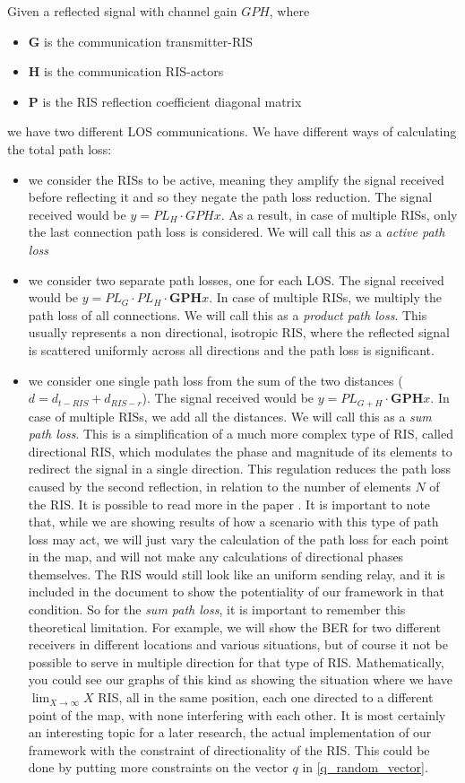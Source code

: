 Given a reflected signal with channel gain $GPH$, where
\begin{itemize}
  \item $\bm{G}$ is the communication transmitter-RIS
  \item $\bm{H}$ is the communication RIS-actors
  \item $\bm{P}$ is the RIS reflection coefficient diagonal matrix
\end{itemize}
we have two different LOS communications. We have different ways of calculating the total path loss:
\begin{itemize}
  \item we consider the RISs to be active, meaning they amplify the signal received before reflecting it and so they negate the path loss reduction. The signal received would be $y = PL_H \cdot GPHx$. As a result, in case of multiple RISs, only the last connection path loss is considered. We will call this as a \textit{active path loss}
  \item we consider two separate path losses, one for each LOS. The signal received would be $y = PL_G \cdot PL_H \cdot \bm{GPH}x$. In case of multiple RISs, we multiply the path loss of all connections. We will call this as a \textit{product path loss}. This usually represents a non directional, isotropic RIS, where the reflected signal is scattered uniformly across all directions and the path loss is significant.
  \item we consider one single path loss from the sum of the two distances ($d = d_{t-RIS} + d_{RIS-r}$). The signal received would be $y = PL_{G+H} \cdot \bm{GPH}x$. In case of multiple RISs, we add all the distances. We will call this as a \textit{sum path loss}. This is a simplification of a much more complex type of RIS, called directional RIS, which modulates the phase and magnitude of its elements to redirect the signal in a single direction. This regulation reduces the path loss caused by the second reflection, in relation to the number of elements $N$ of the RIS. It is possible to read more in the paper \cite{8888223}. It is important to note that, while we are showing results of how a scenario with this type of path loss may act, we will just vary the calculation of the path loss for each point in the map, and will not make any calculations of directional phases themselves. The RIS would still look like an uniform sending relay, and it is included in the document to show the potentiality of our framework in that condition. So for the \textit{sum path loss}, it is important to remember this theoretical limitation. For example, we will show the BER for two different receivers in different locations and various situations, but of course it not be possible to serve in multiple direction for that type of RIS. Mathematically, you could see our graphs of this kind as showing the situation where we have  $\lim_{X \to \infty} X$ RIS, all in the same position, each one directed to a different point of the map, with none interfering with each other. It is most certainly an interesting topic for a later research, the actual implementation of our framework with the constraint of directionality of the RIS. This could be done by putting more constraints on the vector $q$ in \eqref{q_random_vector}.

\end{itemize}
